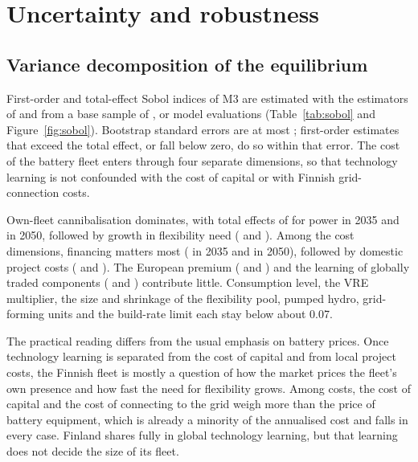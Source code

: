 \documentclass[11pt]{article}
\begin{document}
\section{Uncertainty and robustness}\label{sec:robust}

\subsection{Variance decomposition of the equilibrium}\label{sec:sobol}
First-order and total-effect Sobol indices of M3 are estimated with the estimators of \citet{saltelli2010variance} and \citet{jansen1999anova} from a base sample of , or  model evaluations (Table~\ref{tab:sobol} and Figure~\ref{fig:sobol}). Bootstrap standard errors are at most ; first-order estimates that exceed the total effect, or fall below zero, do so within that error.
The cost of the battery fleet enters through four separate dimensions, so that technology learning is not confounded with the cost of capital or with Finnish grid-connection costs.

Own-fleet cannibalisation dominates, with total effects of  for power in 2035 and  in 2050, followed by growth in flexibility need ( and ).
Among the cost dimensions, financing matters most ( in 2035 and  in 2050), followed by domestic project costs ( and ). The European premium ( and ) and the learning of globally traded components ( and ) contribute little.
Consumption level, the VRE multiplier, the size and shrinkage of the flexibility pool, pumped hydro, grid-forming units and the build-rate limit each stay below about 0.07.

The practical reading differs from the usual emphasis on battery prices. Once technology learning is separated from the cost of capital and from local project costs, the Finnish fleet is mostly a question of how the market prices the fleet's own presence and how fast the need for flexibility grows. Among costs, the cost of capital and the cost of connecting to the grid weigh more than the price of battery equipment, which is already a minority of the annualised cost and falls in every case. Finland shares fully in global technology learning, but that learning does not decide the size of its fleet.
\end{document}
